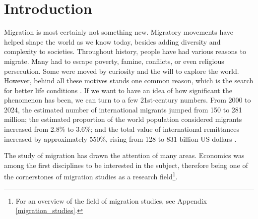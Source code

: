 \section{Introduction} \label{introduction}

Migration is most certainly not something new. Migratory movements have helped shape the world as we know today, besides adding diversity and complexity to societies. Throughout history, people have had various reasons to migrate. Many had to escape poverty, famine, conflicts, or even religious persecution. Some were moved by curiosity and the will to explore the world. However, behind all these motives stands one common reason, which is the search for better life conditions \citep{king_theories_2012, schrover_migration_2022}. If we want to have an idea of how significant the phenomenon has been, we can turn to a few 21st-century numbers. From 2000 to 2024, the estimated number of international migrants jumped from 150 to 281 million; the estimated proportion of the world population considered migrants increased from 2.8\% to 3.6\%; and the total value of international remittances increased by approximately 550\%, rising from 128 to 831 billion US dollars \citep{mcauliffe_world_2024}.

The study of migration has drawn the attention of many areas. Economics was among the first disciplines to be interested in the subject, therefore being one of the cornerstones of migration studies as a research field\footnote{For an overview of the field of migration studies, see Appendix \ref{migration_studies}.}\citep{greenwood_early_2003, levy_between_2020, scholten_introduction_2022}. 